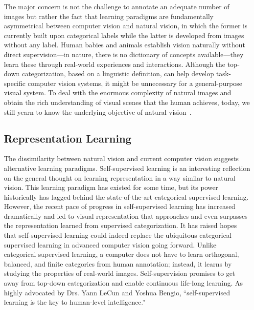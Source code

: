 The major concern is not the challenge to annotate an adequate number of images but rather the fact that learning paradigms are fundamentally asymmetrical between computer vision and natural vision, in which the former is currently built upon categorical labels while the latter is developed from images without any label. Human babies and animals establish vision naturally without direct supervision---in nature, there is no dictionary of concepts available---they learn these through real-world experiences and interactions. Although the top-down categorization, based on a linguistic definition, can help develop task-specific computer vision systems, it might be unnecessary for a general-purpose visual system. To deal with the enormous complexity of natural images and obtain the rich understanding of visual scenes that the human achieves, today, we still yearn to know the underlying objective of natural vision~\citep{yuille2021deep}. 

\subsection{Representation Learning}

The dissimilarity between natural vision and current computer vision suggests alternative learning paradigms. Self-supervised learning is an interesting reflection on the general thought on learning representation in a way similar to natural vision. This learning paradigm has existed for some time, but its power historically has lagged behind the state-of-the-art categorical supervised learning. However, the recent pace of progress in self-supervised learning has increased dramatically and led to visual representation that approaches and even surpasses the representation learned from supervised categorization. It has raised hopes that self-supervised learning could indeed replace the ubiquitous categorical supervised learning in advanced computer vision going forward. Unlike categorical supervised learning, a computer does not have to learn orthogonal, balanced, and finite categories from human annotation; instead, it learns by studying the properties of real-world images. Self-supervision promises to get away from top-down categorization and enable continuous life-long learning. As highly advocated by Drs. Yann LeCun and Yoshua Bengio, ``self-supervised learning is the key to human-level intelligence.''~\citep{wiggers2020yann}

